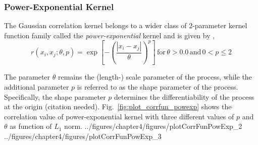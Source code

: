 \subsubsection{Power-Exponential Kernel}

The Gaussian correlation kernel belongs to a wider class of $2$-parameter kernel function family called the \emph{power-exponential} kernel and is given by \cite{Roustant2012,Santner2003,Rasmussen2006},
\begin{equation}
	r(x_i, x_j; \theta, p) = \exp{\left[ - \left( \frac{|x_i - x_j|}{\theta} \right)^p \right]} \, \text{for} \, \theta > 0.0 \, \text{and} \, 0 < p \leq 2
\label{eq:powexp_kernel}
\end{equation}

The parameter $\theta$ remains the (length-) scale parameter of the process, while the additional parameter $p$ is referred to as the shape parameter of the process.
Specifically, the shape parameter $p$ determines the differentiability of the process at the origin (citation needed).
Fig.~\ref{fig:plot_corrfun_powexp} shows the correlation value of power-exponential kernel with three different values of $p$ and $\theta$ as function of $L_1$ norm.
{../figures/chapter4/figures/plotCorrFunPowExp_2}
{../figures/chapter4/figures/plotCorrFunPowExp_3}


